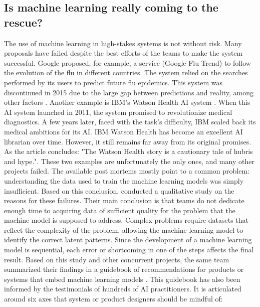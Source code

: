 \subsection{Is machine learning really coming to the rescue?}
The use of machine learning in high-stakes systems is not without risk.
Many proposals have failed despite the best efforts of the teams to make the system successful.
Google proposed, for example, a service (Google Flu Trend) to follow the evolution of the flu in different countries.
The system relied on the searches performed by its users to predict future flu epidemics.
This system was discontinued in 2015 due to the large gap between predictions and reality, among other factors \textcite{lazerWhatWeCan2015,kandulaReappraisingUtilityGoogle2019}.
Another example is IBM's Watson Health AI system \parencite{stricklandIBMWatsonHeal2019}.
When this AI system launched in 2011, the system promised to revolutionize medical diagnostics.
A few years later, faced with the task's difficulty, IBM scaled back its medical ambitions for its AI.
IBM Watson Health has become an excellent AI librarian over time.
However, it still remains far away from its original promises.
As the article concludes: "The Watson Health story is a cautionary tale of hubris and hype.".
These two examples are unfortunately the only ones, and many other projects failed.
The available post mortems mostly point to a common problem: understanding the data used to train the machine learning models was simply insufficient.
Based on this conclusion, \textcite{sambasivanEveryoneWantsModel2021} conducted a qualitative study on the reasons for these failures.
Their main conclusion is that teams do not dedicate enough time to acquiring data of sufficient quality for the problem that the machine model is supposed to address.
Complex problems require datasets that reflect the complexity of the problem, allowing the machine learning model to identify the correct latent patterns.
Since the development of a machine learning model is sequential, each error or shortcoming in one of the steps affects the final result.
Based on this study and other concurrent projects, the same team summarized their findings in a guidebook of recommendations for products or systems that embed machine learning models \parencite{pairPeopleAIGuidebook2021}.
This guidebook has also been informed by the testimonials of hundreds of AI practitioners.
It is articulated around six axes that system or product designers should be mindful of:

